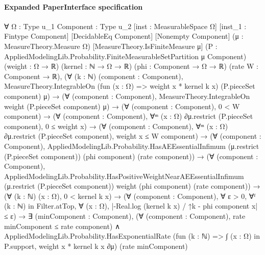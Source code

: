 \documentclass[10pt]{article}
\begin{document}
\paragraph{Expanded PaperInterface specification}
\begin{ReviewVerbatim}
∀ {Ω : Type u_1} {Component : Type u_2} [inst : MeasurableSpace Ω] [inst_1 : Fintype Component] [DecidableEq Component]
  [Nonempty Component] (μ : MeasureTheory.Measure Ω) [MeasureTheory.IsFiniteMeasure μ]
  (P : AppliedModelingLib.Probability.FiniteMeasurableSetPartition μ Component) (weight : Ω → ℝ) (kernel : ℕ → Ω → ℝ)
  (phi : Component → Ω → ℝ) (rate W : Component → ℝ),
  (∀ (k : ℕ) (component : Component),
      MeasureTheory.IntegrableOn (fun (x : Ω) => weight x * kernel k x) (P.pieceSet component) μ) →
    (∀ (component : Component), MeasureTheory.IntegrableOn weight (P.pieceSet component) μ) →
      (∀ (component : Component), 0 < W component) →
        (∀ (component : Component), ∀ᵐ (x : Ω) ∂μ.restrict (P.pieceSet component), 0 ≤ weight x) →
          (∀ (component : Component), ∀ᵐ (x : Ω) ∂μ.restrict (P.pieceSet component), weight x ≤ W component) →
            (∀ (component : Component),
                AppliedModelingLib.Probability.HasAEEssentialInfimum (μ.restrict (P.pieceSet component)) (phi component)
                  (rate component)) →
              (∀ (component : Component),
                  AppliedModelingLib.Probability.HasPositiveWeightNearAEEssentialInfimum
                    (μ.restrict (P.pieceSet component)) weight (phi component) (rate component)) →
                (∀ (k : ℕ) (x : Ω), 0 < kernel k x) →
                  (∀ (component : Component),
                      ∀ ε > 0,
                        ∀ᶠ (k : ℕ) in Filter.atTop, ∀ (x : Ω), |-Real.log (kernel k x) / ↑k - phi component x| ≤ ε) →
                    ∃ (minComponent : Component),
                      (∀ (component : Component), rate minComponent ≤ rate component) ∧
                        AppliedModelingLib.Probability.HasExponentialRate
                          (fun (k : ℕ) => ∫ (x : Ω) in P.support, weight x * kernel k x ∂μ) (rate minComponent)
\end{ReviewVerbatim}
\end{document}
